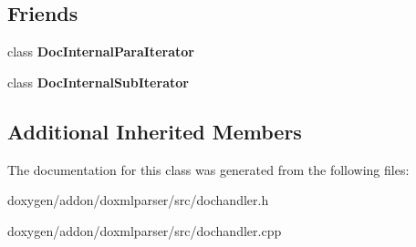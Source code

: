 \subsection*{Friends}
\begin{DoxyCompactItemize}
\item 
\mbox{\label{class_doc_internal_handler_a1fd597f22ffe4116c894d88e4cf681fc}} 
class {\bfseries Doc\+Internal\+Para\+Iterator}
\item 
\mbox{\label{class_doc_internal_handler_a36c6a46fa570a2203116c27a992e1c4e}} 
class {\bfseries Doc\+Internal\+Sub\+Iterator}
\end{DoxyCompactItemize}
\subsection*{Additional Inherited Members}


The documentation for this class was generated from the following files\+:\begin{DoxyCompactItemize}
\item 
doxygen/addon/doxmlparser/src/dochandler.\+h\item 
doxygen/addon/doxmlparser/src/dochandler.\+cpp\end{DoxyCompactItemize}
